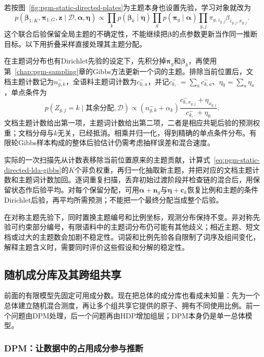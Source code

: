 若按图~\ref{fig:pgm-static-directed-plates}为主题本身也设置先验，学习对象就改为
\[
 p(\bm\beta_{1:K},\bm\pi_{1:G},\bm z\mid\mathcal D,\bm\alpha,\bm\eta)
 \propto\prod_kp(\bm\beta_k\mid\bm\eta)
      \prod_g p(\bm\pi_g\mid\bm\alpha)
      \prod_{g,j}\pi_{g,z_{g,j}}\beta_{z_{g,j},x_{g,j}}.
\]
这个联合后验保留全局主题的不确定性，不能继续把$\bm\beta$的点参数更新当作同一推断目标。以下用折叠采样直接处理其主题分配。

在主题词分布也有Dirichlet先验的设定下，先积分掉$\bm\pi_g$和$\bm\beta_k$，再使用第~\ref{chap:pgm-sampling}章的Gibbs方法更新一个词的主题。排除当前位置后，文档主题计数记为$n_{g,k}^{-}$，全语料主题词计数为$c_{k,a}^{-}$，并记$c_{k,\cdot}^{-}=\sum_a c_{k,a}^{-}$、$\eta_0=\sum_a\eta_a$，单点条件为
\begin{equation}
  \label{eq:pgm-static-directed-lda-gibbs}
  p(Z_{g,j}=k\mid\text{其余分配},\mathcal{D})
     \propto (n_{g,k}^{-}+\alpha_k)
        \frac{c_{k,x_{g,j}}^{-}+\eta_{x_{g,j}}}
             {c_{k,\cdot}^{-}+\eta_0}.
\end{equation}
文档主题计数给出第一项，主题词计数给出第二项，二者是相应共轭后验的预测权重；文档分母与$k$无关，已经抵消。相乘并归一化，得到精确的单点条件分布。有限轮Gibbs样本构成的整体后验估计仍需考虑抽样误差和混合速度。

实际的一次扫描先从计数表移除当前位置原来的主题贡献，计算式~\eqref{eq:pgm-static-directed-lda-gibbs}的$K$个非负权重，再归一化抽取新主题，并把对应的文档主题计数和主题词计数加回。逐词重复扫描，丢弃初始过渡阶段并检查链的混合后，用保留状态作后验平均。对每个保留分配，可用$\bm\alpha+\bm n_g$与$\bm\eta+\bm c_k$恢复比例和主题的条件Dirichlet后验，再平均所需预测；不能把一个最终分配当成整个后验。

在对称主题先验下，同时置换主题编号和比例坐标，观测分布保持不变。非对称先验可约束部分编号，有限语料中的主题词分布仍可能有其他歧义；相近主题、短文档或过大的主题数会加剧不稳定性。词袋和比例先验各自限制了词序及组间变化，解释主题含义时，需要同时评价这些假设和分解的稳定性。

\subsection{随机成分库及其跨组共享}
\label{sec:pgm-static-directed-random-library}

前面的有限模型先固定可用成分数。现在把总体的成分库也看成未知量：先为一个总体建立随机混合测度，再让多个组共享它提供的原子、拥有不同使用比例。前一个问题由DPM处理，后一个问题再由HDP增加组层；DPM本身仍是单一总体模型。

\subsubsection{DPM：让数据中的占用成分参与推断}
\label{sec:pgm-static-directed-dpm-model}

